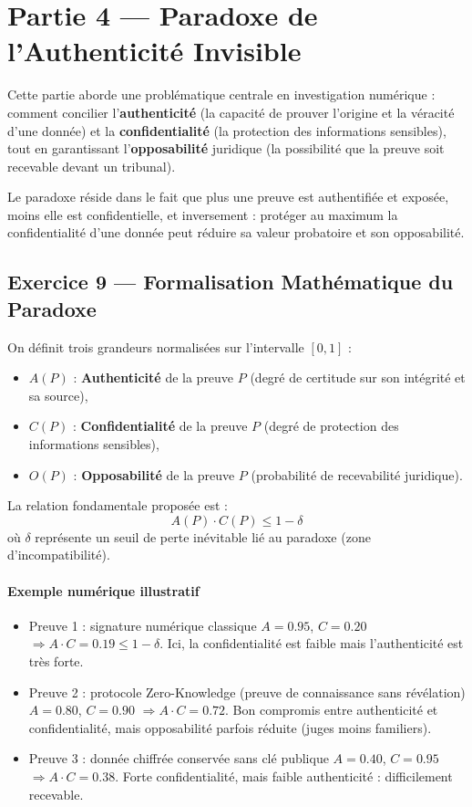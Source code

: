 \documentclass[11pt]{article}
\begin{document}
\section{Partie 4 — Paradoxe de l’Authenticité Invisible}

Cette partie aborde une problématique centrale en investigation numérique : 
comment concilier l’\textbf{authenticité} (la capacité de prouver l’origine et la véracité d’une donnée) 
et la \textbf{confidentialité} (la protection des informations sensibles), 
tout en garantissant l’\textbf{opposabilité} juridique (la possibilité que la preuve soit recevable devant un tribunal).  

Le paradoxe réside dans le fait que plus une preuve est authentifiée et exposée, 
moins elle est confidentielle, et inversement : protéger au maximum la confidentialité d’une donnée 
peut réduire sa valeur probatoire et son opposabilité.

\subsection{Exercice 9 — Formalisation Mathématique du Paradoxe}

On définit trois grandeurs normalisées sur l’intervalle $[0,1]$ :
\begin{itemize}
  \item $A(P)$ : \textbf{Authenticité} de la preuve $P$ (degré de certitude sur son intégrité et sa source),
  \item $C(P)$ : \textbf{Confidentialité} de la preuve $P$ (degré de protection des informations sensibles),
  \item $O(P)$ : \textbf{Opposabilité} de la preuve $P$ (probabilité de recevabilité juridique).
\end{itemize}

La relation fondamentale proposée est :
\[
A(P) \cdot C(P) \leq 1 - \delta
\]
où $\delta$ représente un seuil de perte inévitable lié au paradoxe (zone d’incompatibilité).  

\paragraph{Exemple numérique illustratif}
\begin{itemize}
  \item Preuve 1 : signature numérique classique  
  $A = 0.95$, $C = 0.20$ $\Rightarrow A \cdot C = 0.19 \leq 1 - \delta$.  
  Ici, la confidentialité est faible mais l’authenticité est très forte.  

  \item Preuve 2 : protocole Zero-Knowledge (preuve de connaissance sans révélation)  
  $A = 0.80$, $C = 0.90$ $\Rightarrow A \cdot C = 0.72$.  
  Bon compromis entre authenticité et confidentialité, mais opposabilité parfois réduite (juges moins familiers).  

  \item Preuve 3 : donnée chiffrée conservée sans clé publique  
  $A = 0.40$, $C = 0.95$ $\Rightarrow A \cdot C = 0.38$.  
  Forte confidentialité, mais faible authenticité : difficilement recevable.  
\end{itemize}
\end{document}
